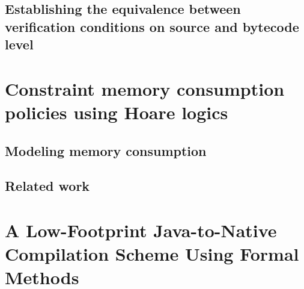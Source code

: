 \documentclass[book,10pt]{book}
\begin{document}
 \section{Establishing the equivalence between verification conditions on source and bytecode level} \label{pog:wpBcGeneral}
    
    
 
\chapter{Constraint memory consumption policies using Hoare logics}\label{applications:memory}
  
  \lstset{numbers=none}

  \section{Modeling memory consumption}\label{sec:verif}
    
  
  
  
  \section{Related work}\label{sec:rel}
  

\chapter{A Low-Footprint Java-to-Native Compilation Scheme Using Formal Methods}\label{applications:optimComp}
  \lstset{frameround=tttt}
  
  
  
  
  
  
   
   
  
 
\end{document}
